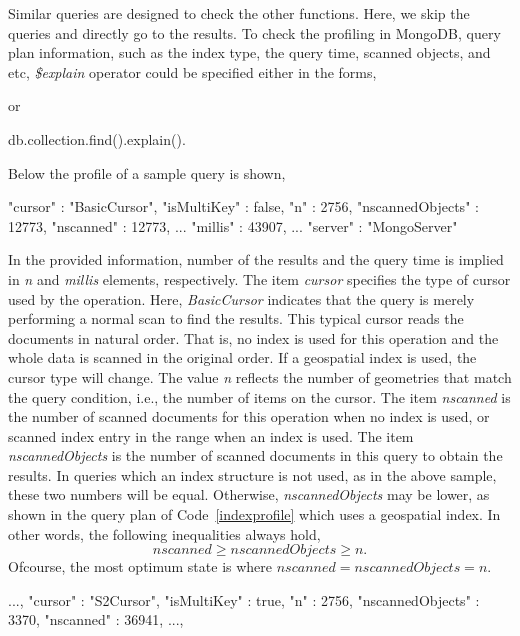 \documentclass[a4paper,12pt]{article}
\begin{document}
Similar queries are designed to check the other functions. Here, we skip the queries and directly go to the results. To check the profiling in MongoDB, query plan information, such as the index type, the query time, scanned objects, and etc, \textit{\$explain} operator could be specified either in the forms,
\vspace{10px}
 or 
 \begin{fakeJSON}
db.collection.find().explain().
 \end{fakeJSON}
\vspace{10px}
Below the profile of a sample query is shown,
\vspace{10px}
\begin{fakeJSON}
"cursor" : "BasicCursor",
"isMultiKey" : false,
"n" : 2756,
"nscannedObjects" : 12773,
"nscanned" : 12773,
...
"millis" : 43907,
...
"server" : "MongoServer"
\end{fakeJSON}
\vspace{10px}

In the provided information, number of the results and the query time is implied in \textit{n} and \textit{millis} elements, respectively. The item \textit{cursor} specifies the type of cursor used by the operation. Here, \textit{BasicCursor} indicates that the query is merely performing a normal scan to find the results. This typical cursor reads the documents in natural order. That is, no index is used for this operation and the whole data is scanned in the original order. If a geospatial index is used, the cursor type will change. The value \textit{n} reflects the number of geometries that match the query condition, i.e., the number of items on the cursor. The item \textit{nscanned} is the number of scanned documents for this operation when no index is used, or scanned index entry in the range when an index is used. The item \textit{nscannedObjects} is the number of scanned documents in this query to obtain the results. In queries which an index structure is not used, as in the above sample, these two numbers will be equal. Otherwise, \textit{nscannedObjects} may be lower, as shown in the query plan of Code~\ref{indexprofile} which uses a geospatial index. 
In other words, the following inequalities always hold,
$$nscanned\geq nscannedObjects\geq n.$$ 
Ofcourse, the most optimum state is where $nscanned=nscannedObjects=n$. 
\vspace{10px}
\begin{fakeJSON}[label=indexprofile,caption=Query profile in MongoDB when the related query uses geospatial index]
...,
"cursor" : "S2Cursor",
"isMultiKey" : true,
"n" : 2756,
"nscannedObjects" : 3370,
"nscanned" : 36941,
...,
\end{fakeJSON}
\vspace{10px}
\end{document}
